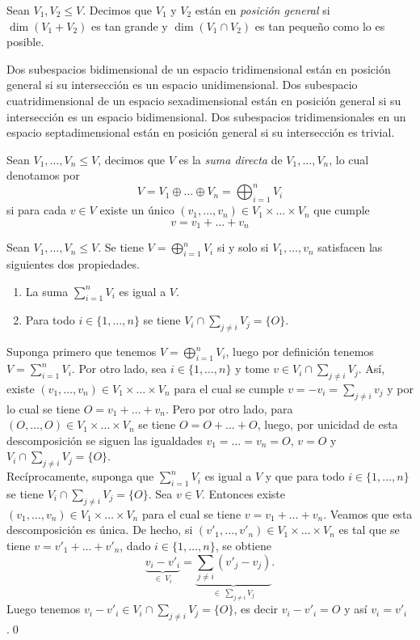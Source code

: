 \begin{defn}
Sean $V_1,V_2\le V$. Decimos que $V_1$ y $V_2$ est\'an en \emph{posici\'on general} si $\dim(V_1+V_2)$ es tan grande y $\dim(V_1\cap V_2)$ es tan peque\~no como lo es posible.
\end{defn}

\begin{ejem}
Dos subespacios bidimensional de un espacio tridimensional est\'an en posici\'on general si su intersecci\'on es un espacio unidimensional. Dos subespacio cuatridimensional de un espacio sexadimensional est\'an en posici\'on general si su intersecci\'on es un espacio bidimensional. Dos subespacios tridimensionales en un espacio septadimensional est\'an en posici\'on general si su intersecci\'on es trivial.
\end{ejem}

\begin{defn}
Sean $V_1,\ldots,V_n\le V$, decimos que $V$ es la \emph{suma directa} de $V_1,\ldots,V_n$, lo cual denotamos por
\[
V=V_1\oplus\ldots\oplus V_n=\bigoplus_{i=1}^n V_i
\]
si para cada $v\in V$ existe un \'unico $(v_1,\ldots,v_n)\in V_1\times\ldots\times V_n$ que cumple
\[
v=v_1+\ldots+v_n
\]
\end{defn}

\begin{pro}\label{sumadirsiysolosi}
Sean $V_1,\ldots,V_n\le V$. Se tiene $V=\bigoplus_{i=1}^n V_i$ si y solo si $V_1,\ldots,v_n$ satisfacen las siguientes dos propiedades.
\begin{enumerate}
\item La suma $\sum_{i=1}^n V_i$ es igual a $V$.
\item Para todo $i\in\{1,\ldots,n\}$ se tiene $V_i\cap\sum_{j\ne i} V_j=\{O\}$.
\end{enumerate}
\end{pro}

\dem Suponga primero que tenemos $V=\bigoplus_{i=1}^n V_i$, luego por definici\'on tenemos $V=\sum_{i=1}^n V_i$. Por otro lado, sea $i\in\{1,\ldots,n\}$ y tome $v\in V_i\cap\sum_{j\ne i} V_j$. As\'i, existe $(v_1,\ldots,v_n)\in V_1\times\ldots\times V_n$ para el cual se cumple $v=-v_i=\sum_{j\ne i} v_j$ y por lo cual se tiene $O=v_1+\ldots+v_n$. Pero por otro lado, para $(O,\ldots,O)\in V_1\times\ldots\times V_n$ se tiene $O=O+\ldots+O$, luego, por unicidad de esta descomposici\'on se siguen las igualdades $v_1=\ldots=v_n=O$, $v=O$ y $V_i\cap\sum_{j\ne i} V_j=\{O\}$.\\
Rec\'iprocamente, suponga que $\sum_{i=1}^n V_i$ es igual a $V$ y que para todo $i\in\{1,\ldots,n\}$ se tiene $V_i\cap\sum_{j\ne i} V_j=\{O\}$. Sea $v\in V$. Entonces existe $(v_1,\ldots,v_n)\in V_1\times\ldots\times V_n$ para el cual se tiene $v=v_1+\ldots+v_n$. Veamos que esta descomposici\'on es \'unica. De hecho, si $(v'_1,\ldots,v'_n)\in V_1\times\ldots\times V_n$ es tal que se tiene $v=v'_1+\ldots+v'_n$, dado $i\in\{1,\ldots,n\}$, se obtiene
\[
\underbrace{v_i-v'_i}_{\in\ V_i}=\underbrace{\sum_{j\ne i} (v'_j-v_j)}_{\in\ \sum_{j\ne i} V_j}.
\]
Luego tenemos $v_i-v'_i\in V_i\cap\sum_{j\ne i} V_j=\{O\}$, es decir $v_i-v'_i=O$ y as\'i $v_i=v'_i$.\qed

